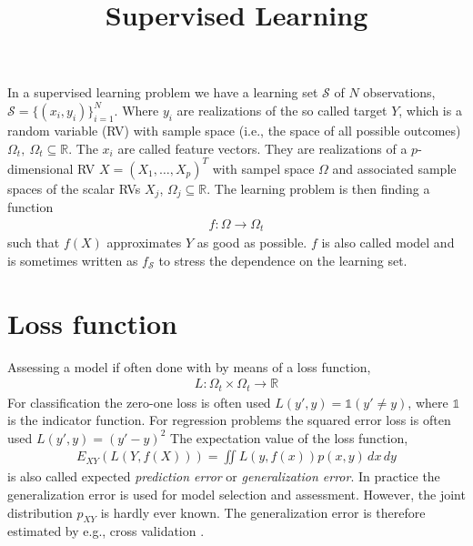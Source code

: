 \documentclass[12pt,a4paper]{article}
\begin{document}
\title{Supervised Learning}
\maketitle

In a supervised learning problem we have a learning set $\mathcal S$ of 
$N$ observations, $\mathcal S = \{(x_i, y_i)\}_{i=1}^N$. Where $y_i$ are realizations of the so called target $Y$, which is a random variable (RV) with sample space (i.e., the space of all possible outcomes) $\Omega_t,  ~ \Omega_t \subseteq \mathbb R$. The $x_i$ are called feature vectors. They are realizations of a $p$-dimensional RV  $X=(X_1, \dots, X_p)^T$ with sampel space $\Omega$ and associated sample spaces of the scalar RVs $X_j$,   $\Omega_j \subseteq \mathbb R$. The learning problem is then finding a function
\begin{align}
	f: \Omega \rightarrow \Omega_t
\end{align}
such that $f(X)$ approximates $Y$ as good as possible. $f$ is also called model and is sometimes written as $f_\mathcal S$ to stress the dependence on the learning set.

\section{Loss function}
Assessing a model if often done with by means of a loss function, 
\begin{align}
	L : \Omega_t \times \Omega_t \rightarrow \mathbb R
\end{align}
For classification the zero-one loss is often used $L(y', y) = \mathbb 1 (y' \neq y)$, where $\mathbb 1$ is the indicator function. For regression problems the squared error loss is often used $L(y', y) = (y' - y)^2 $
The expectation value of the loss function,
\begin{align} \label{eq:expected_loss}
	E_{XY} \left( L(Y, f(X)) \right) = \iint L(y, f(x)) p(x,y)\,dx\, dy
\end{align}
is also called expected \textit{prediction error} or \textit{generalization error}. 
In practice the generalization error is used for model selection and assessment. However,  the joint distribution $p_{XY}$ is hardly ever known. The generalization error is therefore estimated by e.g.,  cross validation \cite{hasties}.
\end{document}
